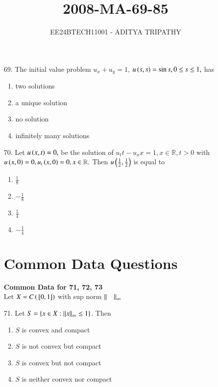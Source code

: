 \documentclass[journal,12pt,onecolumn]{IEEEtran}
\theoremstyle{remark}
\begin{document}

\vspace{3cm}

\title{2008-MA-69-85}
\author{EE24BTECH11001 -  ADITYA TRIPATHY}
\maketitle

\renewcommand{\thefigure}{\theenumi}
\renewcommand{\thetable}{\theenumi}

\begin{enumerate}
	\item[69.] 
	    The initial value problem $u_x + u_y = 1$, $u\left(s, s\right) = \sin s, 0 \le s \le 1,$ has
		\hfill{}
	\begin{multicols}{4}
		\begin{enumerate}
			\item two solutions 
			\columnbreak
			\item a unique solution
			\columnbreak
			\item no solution
			\columnbreak
			\item infinitely many solutions
		\end{enumerate}
	\end{multicols}

\item[70.] Let $u\left(x, t\right) = 0,$ be the solution of $u_tt - u_xx = 1, x \in \mathbb{R}, t > 0$
    with $u\left(x, 0\right) = 0, u_t\left(x, 0\right) = 0, x \in \mathbb{R}.$ Then $u\left(\frac{1}{2}, \frac{1}{2}\right)$ 
        is equal to 
		
		\hfill{}
	\begin{multicols}{4}
		\begin{enumerate}
            \item $\frac{1}{8}$ \columnbreak
            \item $-\frac{1}{8}$ \columnbreak
            \item $\frac{1}{4}$ \columnbreak
            \item $-\frac{1}{4}$ 
		\end{enumerate}
	\end{multicols}

        \section{Common Data Questions}
        \textbf{Common Data for 71, 72, 73}\\
        Let $X = C\left({}\left[0, 1\right]\right)$ with sup norm $\left\lVert\quad\right\rVert_{\infty}$
    \item[71.] Let $S = \{ x \in X : \left\lVert x\right\rVert_{\infty} \le 1 \}$. Then  
		\hfill{}
		\begin{enumerate}
			\item $S$ is convex and compact 
			\item $S$ is not convex but compact
			\item $S$ is convex but not compact 
			\item $S$ is neither convex nor compact
		\end{enumerate}
		

\end{enumerate}
\end{document}

